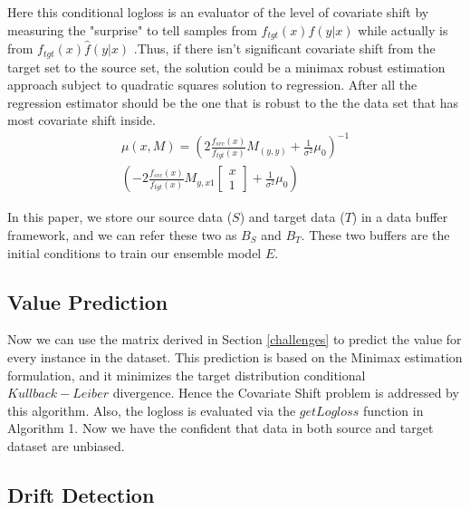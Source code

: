Here this conditional logloss is an evaluator of the level of
covariate shift by measuring the "surprise" to tell samples from
$f_{tgt}(x)f(y|x)$ while actually is from $f_{tgt}(x)\hat{f}
(y|x)$ \cite{Lafferty01}.Thus, if there isn't significant 
covariate shift from the target set to the source set, the
solution could be a minimax robust estimation approach subject to
quadratic squares solution to regression. After all the
regression estimator should be the one that is robust to the the
data set that has most covariate shift inside.
\begin{equation} \label{eq1}
\begin{split}
\mu \left( x, M \right) = \left( 2\frac { f_{ src }\left( x \right)  }{ f_{ tgt }\left( x \right)  } M_{ (y,y) }+\frac { 1 }{ { \sigma  }^{ 2 } } { \mu  }_{ 0 } \right)^{-1} \\ 
  \left( -2\frac { f_{ src }\left( x \right)  }{ f_{ tgt }\left( x \right)  } M_{ y,x1 }\left[ \begin{matrix} x \\ 1 \end{matrix} \right] +\frac { 1 }{ { \sigma  }^{ 2 } } { \mu  }_{ 0 } \right)
\end{split}
\end{equation}

In this paper, we store our source data ($S$) and target data ($T$) in a data buffer framework, and we can refer these two as $B_{S}$ and $B_{T}$. These two buffers are the initial conditions to train our ensemble model $E$. 



\subsection{Value Prediction}
Now we can use the matrix derived in Section \ref{challenges} to
predict the value for every instance in the dataset. This
prediction is based on the Minimax estimation formulation, and
it minimizes the target distribution conditional
$Kullback-Leiber$ divergence. Hence the Covariate Shift problem
is addressed by this algorithm. Also, the logloss is evaluated
via the $getLogloss$ function in Algorithm 1. Now we have the confident
that data in both source and target dataset are unbiased.


\subsection{Drift Detection}

